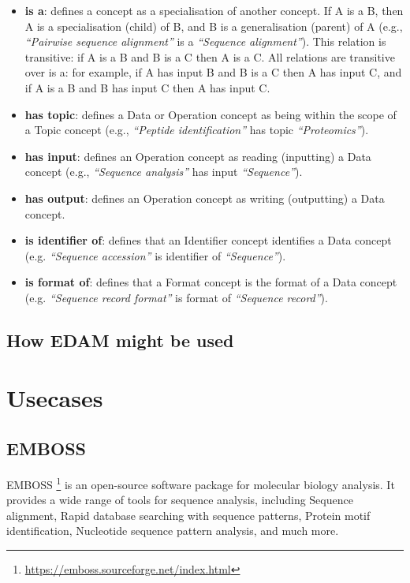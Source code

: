 \documentclass{scrartcl}
\begin{document}
\begin{itemize}
  \item \textbf{is a}: defines a concept as a specialisation of 
    another concept. If A is a B, then A is a specialisation (child) 
    of B, and B is a generalisation (parent) of A (e.g., 
    \textit{“Pairwise sequence alignment”} is a \textit{“Sequence alignment”}).
    This relation is transitive: if A is a B and B is a C then A is a C.
    All relations are transitive over is a: for example, if A 
    has input B and B is a C then A has input C, 
    and if A is a B and B has input C then A has input C.
  \item \textbf{has topic}: defines a Data or Operation concept as being 
    within the scope of a Topic concept (e.g., \textit{“Peptide identification”}
    has topic \textit{“Proteomics”}).
  \item \textbf{has input}: defines an Operation concept as reading (inputting) 
    a Data concept (e.g., \textit{“Sequence analysis”} has input 
    \textit{“Sequence”}).
  \item \textbf{has output}: defines an Operation concept as writing (outputting) 
    a Data concept.
  \item \textbf{is identifier of}: defines that an Identifier concept identifies 
    a Data concept (e.g. \textit{“Sequence accession”} 
    is identifier of \textit{“Sequence”}).
  \item \textbf{is format of}: defines that a Format concept is the format of a 
    Data concept (e.g. \textit{“Sequence record format”} is format 
    of \textit{“Sequence record”}).
\end{itemize}

\subsection{How EDAM might be used}

\newpage

\section{Usecases}

\subsection{EMBOSS}
EMBOSS \footnote{\url{https://emboss.sourceforge.net/index.html}} is an open-source software package 
  for molecular biology analysis. It provides a wide range of tools for sequence analysis, 
  including Sequence alignment, Rapid database searching with sequence patterns, 
  Protein motif identification, Nucleotide sequence pattern analysis, and much more.
\end{document}
